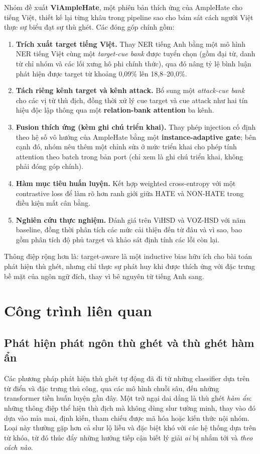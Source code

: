 \documentclass[11pt]{article}
\begin{document}
Nhóm đề xuất \textbf{ViAmpleHate}, một phiên bản thích ứng của AmpleHate cho tiếng Việt, thiết kế lại từng khâu trong pipeline sao cho bám sát cách người Việt thực sự biểu đạt sự thù ghét. Các đóng góp chính gồm:
\begin{enumerate}
  \item \textbf{Trích xuất target tiếng Việt.} Thay NER tiếng Anh bằng một mô hình NER tiếng Việt cùng một \emph{target-cue bank} được tuyển chọn (gồm đại từ, danh từ chỉ nhóm và các lối xưng hô phi chính thức), qua đó nâng tỷ lệ bình luận phát hiện được target từ khoảng 0,09\% lên 18,8--20,0\%.
  \item \textbf{Tách riêng kênh target và kênh attack.} Bổ sung một \emph{attack-cue bank} cho các vị từ thù địch, đồng thời xử lý cue target và cue attack như hai tín hiệu độc lập thông qua một \textbf{relation-bank attention} ba kênh.
  \item \textbf{Fusion thích ứng (kèm ghi chú triển khai).} Thay phép injection cố định theo hệ số vô hướng của AmpleHate bằng một \textbf{instance-adaptive gate}; bên cạnh đó, nhóm nêu thêm một chỉnh sửa ở mức triển khai cho phép tính attention theo batch trong bản port (chỉ xem là ghi chú triển khai, không phải đóng góp chính).
  \item \textbf{Hàm mục tiêu huấn luyện.} Kết hợp weighted cross-entropy với một contrastive loss để làm rõ hơn ranh giới giữa HATE và NON-HATE trong điều kiện mất cân bằng.
  \item \textbf{Nghiên cứu thực nghiệm.} Đánh giá trên ViHSD và VOZ-HSD với năm baseline, đồng thời phân tích các mức cải thiện đến từ đâu và vì sao, bao gồm phân tích độ phủ target và khảo sát định tính các lỗi còn lại.
\end{enumerate}
Thông điệp rộng hơn là: target-aware là một inductive bias hữu ích cho bài toán phát hiện thù ghét, nhưng chỉ thực sự phát huy khi được thích ứng với đặc trưng bề mặt của ngôn ngữ đích, thay vì bê nguyên từ tiếng Anh sang.

\section{Công trình liên quan}

\subsection{Phát hiện phát ngôn thù ghét và thù ghét hàm ẩn}
Các phương pháp phát hiện thù ghét tự động đã đi từ những classifier dựa trên từ điển và đặc trưng thủ công, qua các mô hình chuỗi sâu, đến những transformer tiền huấn luyện gần đây. Một trở ngại dai dẳng là thù ghét \emph{hàm ẩn}: những thông điệp thể hiện thù địch mà không dùng slur tường minh, thay vào đó dựa vào mỉa mai, định kiến, tham chiếu được mã hóa hoặc kiến thức nội nhóm. Loại này thường gặp hơn cả slur lộ liễu và đặc biệt khó với các hệ thống dựa trên từ khóa, từ đó thúc đẩy những hướng tiếp cận biết lý giải \emph{ai} bị nhắm tới và \emph{theo cách nào}.
\end{document}
